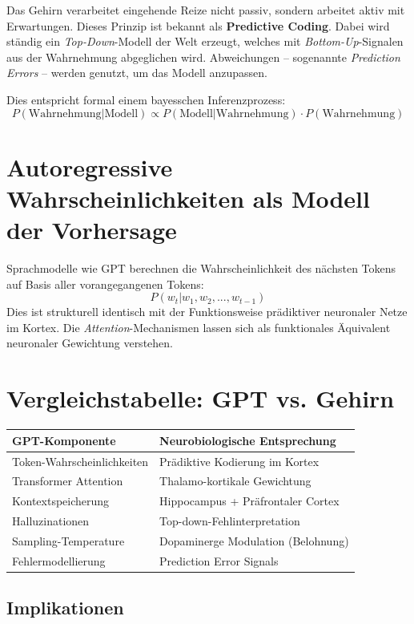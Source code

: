 Das Gehirn verarbeitet eingehende Reize nicht passiv, sondern arbeitet aktiv mit Erwartungen. Dieses Prinzip ist bekannt als \textbf{Predictive Coding}. Dabei wird ständig ein \textit{Top-Down}-Modell der Welt erzeugt, welches mit \textit{Bottom-Up}-Signalen aus der Wahrnehmung abgeglichen wird. Abweichungen – sogenannte \textit{Prediction Errors} – werden genutzt, um das Modell anzupassen.

Dies entspricht formal einem bayesschen Inferenzprozess:
\[
P(\text{Wahrnehmung}|\text{Modell}) \propto P(\text{Modell}|\text{Wahrnehmung}) \cdot P(\text{Wahrnehmung})
\]

\section{Autoregressive Wahrscheinlichkeiten als Modell der Vorhersage}

Sprachmodelle wie GPT berechnen die Wahrscheinlichkeit des nächsten Tokens auf Basis aller vorangegangenen Tokens:
\[
P(w_t | w_1, w_2, ..., w_{t-1})
\]
Dies ist strukturell identisch mit der Funktionsweise prädiktiver neuronaler Netze im Kortex. Die \textit{Attention}-Mechanismen lassen sich als funktionales Äquivalent neuronaler Gewichtung verstehen.

\section{Vergleichstabelle: GPT vs. Gehirn}

\begin{center}
\begin{tabular}{|l|l|}
\hline
\textbf{GPT-Komponente} & \textbf{Neurobiologische Entsprechung} \\
\hline
Token-Wahrscheinlichkeiten & Prädiktive Kodierung im Kortex \\
Transformer Attention & Thalamo-kortikale Gewichtung \\
Kontextspeicherung & Hippocampus + Präfrontaler Cortex \\
Halluzinationen & Top-down-Fehlinterpretation \\
Sampling-Temperature & Dopaminerge Modulation (Belohnung) \\
Fehlermodellierung & Prediction Error Signals \\
\hline
\end{tabular}
\end{center}

\subsection{Implikationen}

